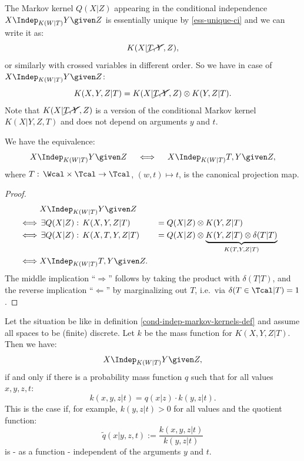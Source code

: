 \begin{Not}
    The Markov kernel $Q(X|Z)$ appearing in the conditional independence $X \Indep_{K(W|T)} Y \given Z$ is essentially unique
    by \ref{ess-unique-ci} and we can write it as:
    \[ K(X|\cancel{T,Y},Z),\]
    or similarly with crossed variables in different order.
    So we have in case of $X \Indep_{K(W|T)} Y \given Z$:
\[ K(X,Y,Z|T) = K(X|\cancel{T,Y},Z)\otimes K(Y,Z|T).\]
Note that $K(X|\cancel{T,Y},Z)$ is a version of the conditional Markov kernel $K(X|Y,Z,T)$ and does not depend on arguments $y$ and $t$.
\end{Not}

\begin{Rem}
    \label{add-T}
 We have the equivalence:
 \[X \Indep_{K(W|T) } Y \given Z \quad\iff \quad X \Indep_{K(W|T)} T,Y \given Z,\]
where $T :\, \Wcal \times \Tcal \to \Tcal$, $(w,t) \mapsto t$, is the canonical projection map.
\begin{proof}
\begin{align*}
&X \Indep_{K(W|T)} Y \given Z \\
\iff &\, \exists Q(X|Z):\, K(X,Y,Z|T) &&= Q(X|Z) \otimes K(Y,Z|T)\\
\iff &\, \exists Q(X|Z):\, K(X,T,Y,Z|T) &&= Q(X|Z)\otimes \underbrace{ K(Y,Z|T)  \otimes  \delta(T|T)  }_{K(T,Y,Z|T)}\\
\iff& X \Indep_{K(W|T)} T,Y \given Z.
\end{align*}
The middle implication ``$\Longrightarrow$'' follows by taking the product with $\delta(T|T)$, 
and the reverse implication ``$\Longleftarrow$'' by marginalizing out $T$, i.e.\ via $\delta(T \in \Tcal|T)=1$.
\end{proof}
\end{Rem}


\begin{Eg}
    Let the situation be like in definition \ref{cond-indep-markov-kernels-def} and assume all spaces to be (finite) discrete.
    Let $k$ be the mass function for $K(X,Y,Z|T)$.
    Then we have: 
    \[X \Indep_{K(W|T)} Y \given Z, \]
    if and only if there is a probability mass function $q$ such that for all values $x,y,z,t$:
    \[ k(x,y,z|t) = q(x|z) \cdot k(y,z|t). \]
    This is the case if, for example, $k(y,z|t) >0$ for all values and the quotient function:
    \[ \tilde q(x|y,z,t) :=  \frac{k(x,y,z|t)}{k(y,z|t)}   \]
    is - as a function - independent of the arguments $y$ and $t$. %
\end{Eg}

